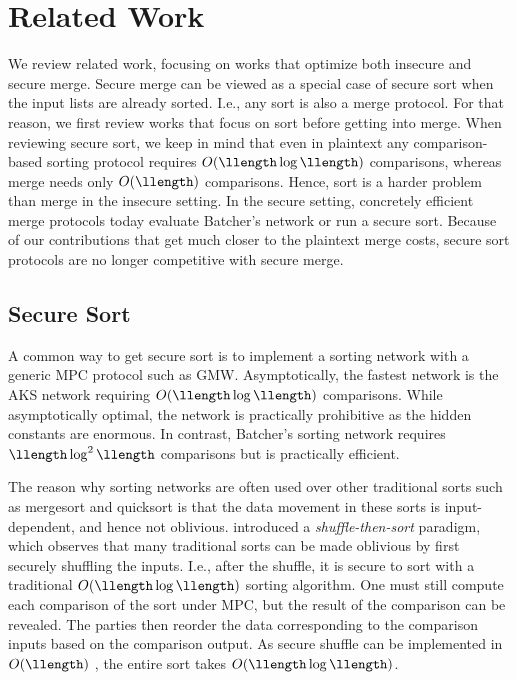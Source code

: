 \section{Related Work}\label{sec:relwork}

We review related work, focusing on works that optimize both insecure and secure merge. %
Secure merge can be viewed as a special case of secure sort when the input lists are already sorted. I.e., any sort is also a merge protocol.
For that reason, we first review works that focus on sort before getting into merge.
When reviewing secure sort, we keep in mind that even in plaintext any comparison-based sorting protocol requires $O(\llength\log\llength)$ comparisons, whereas merge needs only $O(\llength)$ comparisons.
Hence, sort is a harder problem than merge in the insecure setting.
In the secure setting, concretely efficient merge protocols today evaluate Batcher's network or run a secure sort.
Because of our contributions that get much closer to the plaintext merge costs, secure sort protocols are no longer competitive with secure merge.

\subsection{Secure Sort}\label{sec:relworksorting}

A common way to  get secure sort is to implement a sorting network with a generic MPC protocol such as GMW. Asymptotically, the fastest network is the AKS network \cite{COM:AKS83} requiring $O(\llength\log\llength)$ comparisons. While asymptotically optimal, the network is practically prohibitive as the hidden constants are enormous.
In contrast, Batcher's sorting network \cite{AFIPS:Bat68} requires $\llength\log^2\llength$ comparisons but is practically efficient.

The reason why sorting networks are often used over other traditional sorts such as mergesort and quicksort is that the data movement in these sorts is input-dependent, and hence not oblivious.
\cite{ICISC:HKICT12} introduced a \emph{shuffle-then-sort} paradigm, which  observes that many traditional sorts can be made oblivious by first securely shuffling the inputs.
I.e., after the shuffle, it is secure to sort with a traditional  $O(\llength\log\llength)$ sorting algorithm. 
One must still compute each comparison of the sort under MPC, but the result of the comparison can be revealed. The parties then reorder the data corresponding to the comparison inputs based on the comparison output. As secure shuffle can be implemented in $O(\llength)$ \cite{EPRINT:PRRS23}, the entire sort takes $O(\llength\log\llength)$.

